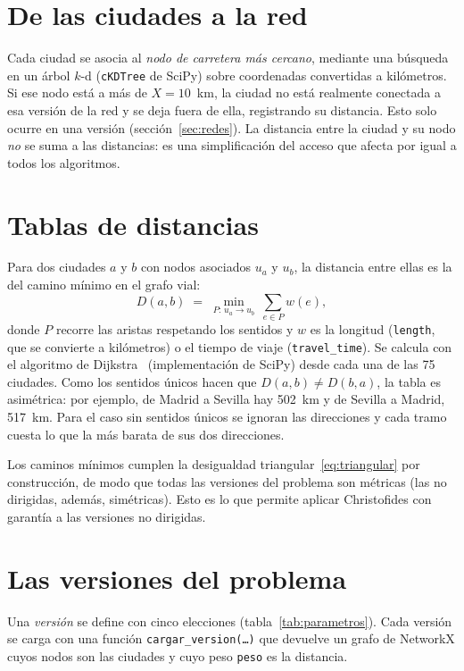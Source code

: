 \section{De las ciudades a la red}

Cada ciudad se asocia al \emph{nodo de carretera más cercano}, mediante una búsqueda en un árbol $k$-d (\texttt{cKDTree} de SciPy) sobre coordenadas convertidas a kilómetros. Si ese nodo está a más de
$X=10$~km, la ciudad no está realmente conectada a esa versión de la red y se deja fuera de ella, registrando su distancia. Esto solo ocurre en una versión (sección~\ref{sec:redes}). La distancia entre la ciudad y su nodo
\emph{no} se suma a las distancias: es una simplificación del acceso que afecta por igual a todos los algoritmos.

\section{Tablas de distancias}

Para dos ciudades $a$ y $b$ con nodos asociados $u_a$ y $u_b$, la distancia entre ellas es la del camino mínimo en el grafo vial:
\begin{equation}\label{eq:dijkstra}
  D(a,b)\;=\;\min_{P:\,u_a\to u_b}\ \sum_{e\in P} w(e),
\end{equation}
donde $P$ recorre las aristas respetando los sentidos y $w$ es la longitud (\texttt{length}, que se convierte a kilómetros) o el tiempo de viaje (\texttt{travel\_time}). Se calcula con el algoritmo de Dijkstra~\cite{dijkstra1959} (implementación de SciPy) desde cada una de las 75 ciudades.
Como los sentidos únicos hacen que $D(a,b)\neq D(b,a)$, la tabla es asimétrica: por ejemplo, de Madrid a Sevilla hay 502~km y de Sevilla a Madrid, 517~km. Para el caso sin sentidos únicos se ignoran las direcciones y cada tramo cuesta lo
que la más barata de sus dos direcciones.

Los caminos mínimos cumplen la desigualdad triangular~\eqref{eq:triangular} por construcción, de modo que todas las versiones del problema son métricas (las no dirigidas, además, simétricas). Esto es lo que permite aplicar
Christofides con garantía a las versiones no dirigidas.

\section{Las versiones del problema}\label{sec:versiones}

Una \emph{versión} se define con cinco elecciones (tabla~\ref{tab:parametros}). Cada versión se carga con una función \texttt{cargar\_version(\dots)} que devuelve un grafo de NetworkX cuyos nodos son las ciudades y
cuyo peso \texttt{peso} es la distancia.

